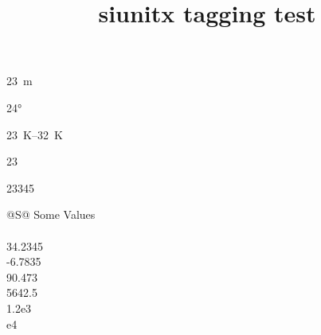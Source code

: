 \documentclass{article}
\title{siunitx tagging test}
\begin{document}
\qty{23}{\meter}


\ang{24}

\qtyrange{23}{32}{\kelvin}


\num{23}

\numlist{23 34 5}

\begin{table}
\caption{Standard behavior of the \texttt{S} column type.}
\begin{tabular}{@{}S@{}}
\toprule
{Some Values} \\
 \\
34.2345 \\
-6.7835 \\
90.473 \\
5642.5 \\
1.2e3 \\
e4 \\
\bottomrule
\end{tabular}
\end{table}
\end{document}
